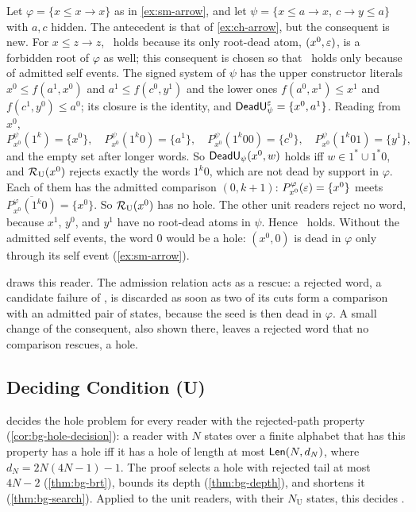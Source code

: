 \begin{example}\label{ex:un-arrow}
Let $\varphi=\{x\le x\to x\}$ as in \cref{ex:sm-arrow}, and let
$\psi=\{x\le a\to x,\ c\to y\le a\}$ with $a,c$ hidden. The antecedent is that
of \cref{ex:ch-arrow}, but the consequent is new. For $x\le z\to z$,
\CondU\ holds because its only root-dead atom, $(x^0,\varepsilon)$, is a forbidden
root of $\varphi$ as well; this consequent is chosen so that \CondU\ holds only
because of admitted self events. The signed system of
$\psi$ has the upper constructor literals $x^0\le f(a^1,x^0)$ and
$a^1\le f(c^0,y^1)$ and the lower ones $f(a^0,x^1)\le x^1$ and
$f(c^1,y^0)\le a^0$; its closure is the identity, and
$\mathsf{DeadU}^\varepsilon_\psi=\{x^0,a^1\}$. Reading from $x^0$,
\[
 P^\psi_{x^0}(1^k)=\{x^0\},\quad P^\psi_{x^0}(1^k0)=\{a^1\},\quad
 P^\psi_{x^0}(1^k00)=\{c^0\},\quad P^\psi_{x^0}(1^k01)=\{y^1\},
\]
and the empty set after longer words. So $\mathsf{DeadU}_\psi(x^0,w)$ holds iff
$w\in1^*\cup1^*0$, and $\mathcal R_{\mathrm U}(x^0)$ rejects exactly the words $1^k0$, which are
not dead by support in $\varphi$. Each of them has the admitted comparison
$(0,k+1)$: $P^\varphi_{x^0}(\varepsilon)=\{x^0\}$ meets
$\overline{P^\varphi_{x^0}(1^k0)}=\{x^0\}$. So $\mathcal R_{\mathrm U}(x^0)$ has no hole. The other
unit readers reject no word, because $x^1$, $y^0$, and $y^1$ have no root-dead
atoms in $\psi$. Hence \CondU\ holds. Without the admitted self events, the
word $0$ would be a hole: $(x^0,0)$ is dead in $\varphi$ only through its self event
(\cref{ex:sm-arrow}).
\end{example}

 draws this reader. The admission relation acts as a
rescue: a rejected word, a candidate failure of \CondU, is discarded as soon
as two of its cuts form a comparison with an admitted pair of states, because
the seed is then dead in $\varphi$. A small change of the consequent, also
shown there, leaves a rejected word that no comparison rescues, a hole.



\subsection{Deciding Condition (U)}\label{sec:un-decide}

 decides the hole problem for every reader with the
rejected-path property (\cref{cor:bg-hole-decision}): a reader with $N$ states
over a finite alphabet that has this property has a hole iff it has a hole of
length at most $\mathsf{Len}(N,d_N)$, where $d_N=2N(4N-1)-1$. The proof selects a
hole with rejected tail at most $4N-2$ (\cref{thm:bg-brt}), bounds its depth
(\cref{thm:bg-depth}), and shortens it (\cref{thm:bg-search}). Applied to the
unit readers, with their $N_{\mathrm U}$ states, this decides \CondU.

